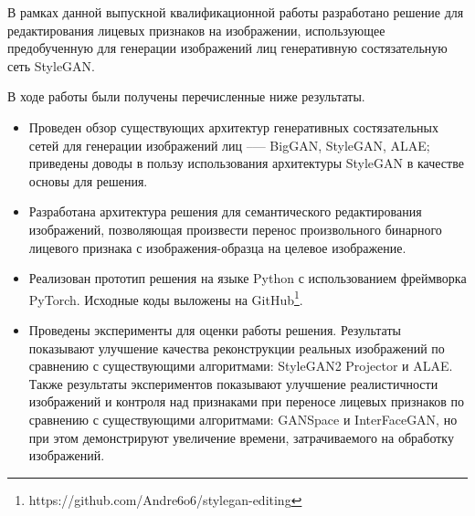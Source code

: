 
В рамках данной выпускной квалификационной работы разработано решение для редактирования лицевых признаков на изображении, использующее предобученную для генерации изображений лиц генеративную состязательную сеть StyleGAN. 

В ходе работы были получены перечисленные ниже результаты.

\begin{itemize}
\item Проведен обзор существующих архитектур генеративных состязательных сетей для генерации изображений лиц --— BigGAN, StyleGAN, ALAE; приведены доводы в пользу использования архитектуры StyleGAN в качестве основы для решения.
\item Разработана архитектура решения для семантического редактирования изображений, позволяющая произвести перенос произвольного бинарного лицевого признака с изображения-образца на целевое изображение.
\item Реализован прототип решения на языке Python с использованием фреймворка PyTorch. Исходные коды выложены на GitHub\footnote{https://github.com/Andre6o6/stylegan-editing}.

\item Проведены эксперименты для оценки работы решения. 
Результаты показывают улучшение качества реконструкции реальных изображений по сравнению с существующими алгоритмами: \foreignlanguage{english}{StyleGAN2 Projector} и ALAE. 
Также  результаты экспериментов показывают улучшение реалистичности изображений и контроля над признаками при переносе лицевых признаков по сравнению с существующими алгоритмами: GANSpace и InterFaceGAN, но при этом демонстрируют увеличение времени, затрачиваемого на обработку изображений.

\end{itemize}